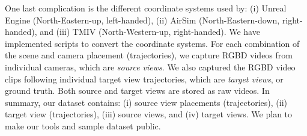 One last complication is the different coordinate systems used by: (i) Unreal Engine (North-Eastern-up, left-handed), (ii) AirSim (North-Eastern-down, right-handed), and (iii) TMIV (North-Western-up, right-handed).
We have implemented scripts to convert the coordinate systems.
For each combination of the scene and camera placement (trajectories), we capture RGBD videos from individual cameras, which are {\em source views}.
We also captured the RGBD video clips following individual target view trajectories, which are {\em target views}, or ground truth.
Both source and target views are stored as raw videos.
In summary, our dataset contains: (i) source view placements (trajectories), (ii) target view (trajectories), (iii) source views, and (iv) target views.
We plan to make our tools and sample dataset public.
